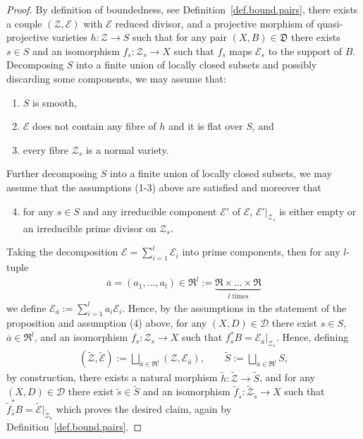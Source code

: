 \documentclass[11pt]{ip-journal}
\theoremstyle{definition}
\begin{document}
\begin{proof}
By definition of boundedness, see Definition~\ref{def.bound.pairs}, there exists a couple 
$(\mathcal Z, \mathcal{E})$ 
with 
$\mathcal E$ 
reduced divisor, and a projective morphism of quasi-projective varieties 
$h \colon \mathcal Z \to S$ 
such that for any pair 
$(X, B) \in \mathfrak{D}$ 
there exists 
$s \in S$ 
and an isomorphism 
$f_s \colon \mathcal{Z}_s \to X$ 
such that 
$f_s$ 
maps 
$\mathcal{E}_s$ 
to the support of 
$B$.
\newline
Decomposing 
$S$ 
into a finite union of locally closed subsets and possibly discarding some components, we may assume that:
\begin{enumerate}
    \item 
$S$ is smooth,
    \item 
$\mathcal E$ 
does not contain any fibre of 
$h$ and it is flat over 
$S$, 
and 
    \item
every fibre 
$\mathcal{Z}_s$ 
is a normal variety.
\end{enumerate}
Further decomposing 
$S$ 
into a finite union of locally closed subsets, we may assume that the assumptions (1-3) above are satisfied and moreover that 
\begin{enumerate}
\setcounter{enumi}{3}
    \item 
for any 
$s \in S$ 
and any irreducible component 
$\mathcal E'$ 
of 
$\mathcal E$, 
$\mathcal E'\vert_{\mathcal Z_s}$ 
is either empty or an irreducible prime divisor on 
$\mathcal Z_s$.
\end{enumerate}
Taking the decomposition
$\mathcal E = \sum_{i =1}^l \mathcal E_i$
into prime components, 
then for any 
$l$-tuple 
\begin{align*}
\overline a = (a_1, \dots, a_l) \in \mathfrak R^l:= \underbrace{\mathfrak R \times \dots \times \mathfrak R}_{\text{$l$ times}}
\end{align*}
we define 
$\mathcal E_{\overline a} :=
\sum_{i =1}^l a_i \mathcal E_i$.
Hence, 
by the assumptions in the statement of the proposition and assumption (4) above, 
for any 
$(X, D) \in \mathcal D$ 
there exist
$s \in S$, 
$\overline a \in \mathfrak R^l$,
and an isomorphism 
$f_s \colon \mathcal{Z}_s \to X$ 
such that 
$f_s^\ast B = \mathcal E_{\overline a} \vert_{\mathcal Z_s}$.
Hence, defining
\begin{align*}
(\tilde{\mathcal Z}, \tilde{\mathcal E}) 
:=
\bigsqcup_{\overline a \in \mathfrak R^l}    
(\mathcal Z, \mathcal E_{\overline a}), 
\qquad 
\tilde{S} 
:=
\bigsqcup_{\overline a \in \mathfrak R^l}  
S,
\end{align*}
by construction, there exists a natural morphism
$\tilde h \colon \tilde{ \mathcal Z} \rightarrow \tilde S$, 
and for any 
$(X, D) \in \mathcal D$ 
there exist 
$\tilde s \in \tilde S$ 
and an isomorphism 
$\tilde {f}_{\tilde s} \colon \tilde{\mathcal{Z}}_{\tilde s} \to X$ 
such that 
$\tilde {f}_{\hat s}^\ast B= \tilde{\mathcal E}\vert_{\tilde{\mathcal Z}_{\tilde s}}$
which proves the desired claim, again by Definition~\ref{def.bound.pairs}.
\end{proof}
\end{document}
